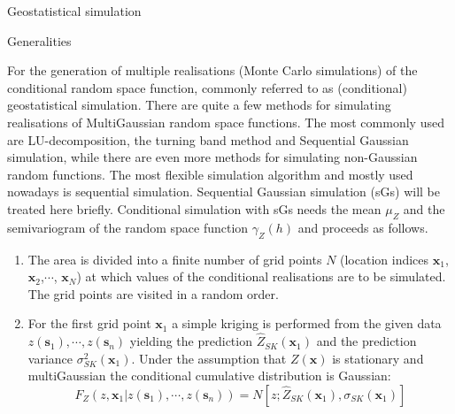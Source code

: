 \documentclass[8pt]{beamer}
\renewcommand{\emph}[1]{\textcolor{myorange}{#1}}
\begin{document}
  \begin{frame}{Geostatistical simulation}
     \begin{block}{Generalities}
    \end{block}
    For the generation of multiple realisations (\emph{Monte Carlo simulations}) of the \emph{conditional random space function}, commonly referred to as (conditional) \emph{geostatistical simulation}. There are quite a few methods for \emph{simulating realisations} of \emph{MultiGaussian random space functions}. The most commonly used are \alert{LU-decomposition}, the \alert{turning band method} and \alert{Sequential Gaussian simulation}, while there are even more methods for \emph{simulating non-Gaussian random functions}. The \emph{most flexible simulation algorithm} and mostly used nowadays is \emph{sequential simulation}. \emph{Sequential Gaussian simulation (sGs)} will be treated here briefly. \emph{Conditional simulation} with \emph{sGs} needs the \emph{mean} $\mu_Z$ and the \emph{semivariogram} of the \emph{random space function} $\gamma_Z(h)$ and proceeds as follows.
    \begin{enumerate}
        \item The \emph{area} is divided into a finite number of grid points $N$ (location indices $\mathbf{x}_1$, $\mathbf{x}_2$,$\cdots$, $\mathbf{x}_N$) at which values of the conditional realisations are to be simulated. The grid points are visited in a random order.
        \item For the first grid point $\mathbf{x}_1$ a \emph{simple kriging} is performed from the given data $z(\mathbf{s}_1),\cdots,z(\mathbf{s}_n)$  yielding the prediction $\hat{Z}_{SK}(\mathbf{x}_1)$ and the \emph{prediction variance} $\sigma_{SK}^2(\mathbf{x}_1)$. Under the assumption that $Z(\mathbf{x})$  is \emph{stationary and multiGaussian} the \emph{conditional cumulative distribution} is \emph{Gaussian}:
            \begin{equation}
                F_Z(z,\mathbf{x}_1 | z(\mathbf{s}_1), \cdots, z(\mathbf{s}_n)) = N\left[z;\hat{Z}_{SK}(\mathbf{x}_1), \sigma_{SK}(\mathbf{x}_1) \right]
                \label{e739}
            \end{equation}

    \end{enumerate}
\end{frame}
 
\end{document}
